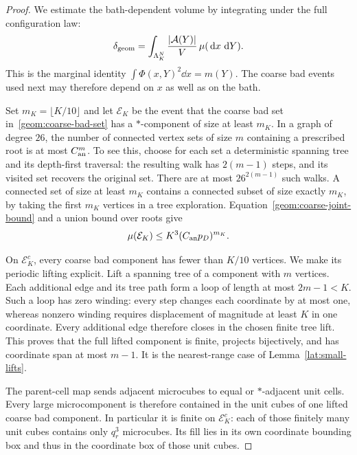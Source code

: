 \begin{proof}
We estimate the bath-dependent volume by integrating under the full
configuration law:
\begin{equation}\label{geom:bath-volume-identity}
 \delta_{\rm geom}
 =\int_{\Lambda_K^N}\frac{|\mathcal A(Y)|}{V}\,\mu(\,\mathrm d x\,\,\mathrm d Y).
\end{equation}
This is the marginal identity $\int\Phi(x,Y)^2\dd x=m(Y)$.
The coarse bad events used next may therefore depend on $x$ as well
as on the bath.

Set $m_K=\lfloor K/10\rfloor$ and let $\mathcal E_K$ be the event
that the coarse bad set in~\eqref{geom:coarse-bad-set} has a
$*$-component of size at least $m_K$. In a graph of degree $26$, the
number of connected vertex sets of size $m$ containing a prescribed root
is at most $C_{\rm an}^m$. To see this, choose for each set a deterministic
spanning tree and its depth-first traversal: the resulting walk has
$2(m-1)$ steps, and its visited set recovers the original set. There are
at most $26^{2(m-1)}$ such walks. A connected set of size at least $m_K$
contains a connected subset of size exactly $m_K$, by taking the first
$m_K$ vertices in a tree exploration. Equation~\eqref{geom:coarse-joint-bound}
and a union bound over roots give
\begin{equation}\label{geom:large-animal-error}
 \mu(\mathcal E_K)
 \le K^3(C_{\rm an}p_D)^{m_K}.
\end{equation}

On $\mathcal E_K^c$, every coarse bad component has fewer than $K/10$
vertices. We make its periodic lifting explicit. Lift a spanning tree of
a component with $m$ vertices. Each additional edge and its tree path
form a loop of length at most $2m-1<K$. Such a loop has zero winding:
every step changes each coordinate by at most one, whereas nonzero winding
requires displacement of magnitude at least $K$ in one coordinate.
Every additional edge therefore closes in the chosen finite tree lift.
This proves that the full lifted component is finite, projects bijectively,
and has coordinate span at most $m-1$. It is the nearest-range case of
Lemma~\ref{lat:small-lifts}.

The parent-cell map sends adjacent microcubes to equal or $*$-adjacent
unit cells. Every large microcomponent is therefore contained in the unit
cubes of one lifted coarse bad component. In particular it is finite on
$\mathcal E_K^c$: each of those finitely many unit cubes contains only
$q_r^3$ microcubes. Its fill lies in its own coordinate bounding box and
thus in the coordinate box of those unit cubes.


\end{proof}
